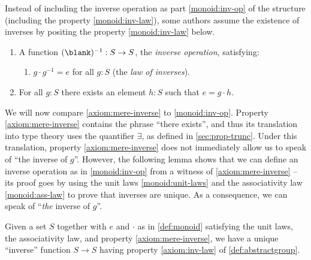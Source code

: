 \begin{remark}\label{rem:inverses-as-property}
  Instead of including the inverse operation as part
  \ref{monoid:inv-op} of the structure (including the property
  \ref{monoid:inv-law}), some authors assume the existence of inverses
  by positing the property \ref{monoid:inv-law} below.
  \begin{enumerate}[start=4]
    \item\label{monoid:inv-op} A function $(\blank)^{-1}:S\to S$, 
    the \emph{inverse operation}, satisfying:
    \begin{enumerate}[start=3,label=(\alph*),ref=\ref{monoid:inv-op} (\alph*),resume*]
    \item\label{monoid:inv-law} $g\cdot g^{-1} = e$ for all $g:S$ (the \emph{law of inverses}).
    \end{enumerate}
    \item\label{axiom:mere-inverse} For all $g:S$ there exists an element
    $h:S$ such that $e = g \cdot h$.
  \end{enumerate}

  We will now compare \ref{axiom:mere-inverse} to \ref{monoid:inv-op}.
  Property \ref{axiom:mere-inverse} contains the phrase ``there exists'', and thus its translation into type theory
  uses the quantifier $\exists$, as defined in \cref{sec:prop-trunc}.  Under this translation, property \ref{axiom:mere-inverse} does
  not immediately allow us to speak of ``the inverse of $g$''.
  However, the following lemma shows that we can define an inverse operation as in \ref{monoid:inv-op} from a witness of \ref{axiom:mere-inverse}
  -- its proof goes by using the unit laws \ref{monoid:unit-laws} and the
associativity law \ref{monoid:ass-law} to prove that inverses are unique.  
As a consequence, we can speak of ``\emph{the} inverse of $g$''.
\end{remark}

\begin{lemma}%
  \label{lem:group-inv-operation}%
  Given a set $S$ together with $e$ and $\cdot$ as in
  \cref{def:monoid} satisfying the unit laws, the associativity
  law, and property \ref{axiom:mere-inverse}, we have a unique ``inverse'' function
  $S \to S$ having property \ref{axiom:inv-law} of \cref{def:abstractgroup}.
\end{lemma}

